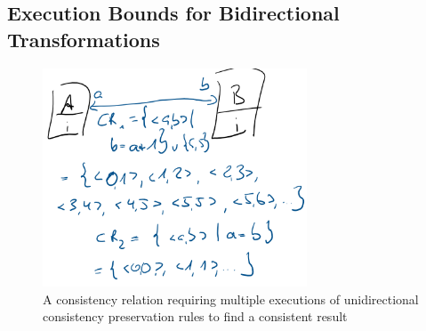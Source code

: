 

\subsection{Execution Bounds for Bidirectional Transformations}

\begin{figure}
    \centering
    \includegraphics[width=0.7\textwidth]{figures/correctness/synchronization/multiple_unidirectional_execution.png}
    \caption[Multiple execution of unidirectional consistency preservation rules]{A consistency relation requiring multiple executions of unidirectional consistency preservation rules to find a consistent result}
    \label{fig:synchronization:multiple_unidirectional_execution}
\end{figure}

